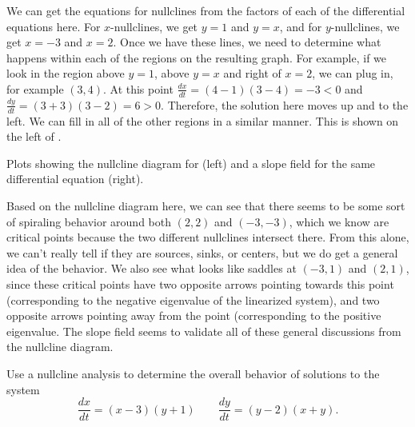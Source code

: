 \documentclass{ximera}
\begin{document}
\begin{exampleSol}
    We can get the equations for nullclines from the factors of each of the differential equations here. For $x$-nullclines, we get $y=1$ and $y=x$, and for $y$-nullclines, we get $x=-3$ and $x=2$. Once we have these lines, we need to determine what happens within each of the regions on the resulting graph. For example, if we look in the region above $y=1$, above $y=x$ and right of $x=2$, we can plug in, for example $(3,4)$. At this point $\frac{dx}{dt} = (4-1)(3-4) = -3 < 0$ and $\frac{dy}{dt} = (3+3)(3-2) = 6 > 0$. Therefore, the solution here moves up and to the left. We can fill in all of the other regions in a similar manner. This is shown on the left of .
    
    \begin{myfig}
        \capstart
        \caption{Plots showing the nullcline diagram for  (left) and a slope field for the same differential equation (right). \label{fig:NCPlot1}}
    \end{myfig}

    Based on the nullcline diagram here, we can see that there seems to be some sort of spiraling behavior around both $(2,2)$ and $(-3, -3)$, which we know are critical points because the two different nullclines intersect there. From this alone, we can't really tell if they are sources, sinks, or centers, but we do get a general idea of the behavior. We also see what looks like saddles at $(-3, 1)$ and $(2, 1)$, since these critical points have two opposite arrows pointing towards this point (corresponding to the negative eigenvalue of the linearized system), and two opposite arrows pointing away from the point (corresponding to the positive eigenvalue. The slope field seems to validate all of these general discussions from the nullcline diagram.
\end{exampleSol}



\begin{example} \label{ex:Nullcline2}
    Use a nullcline analysis to determine the overall behavior of solutions to the system
    \begin{equation*}
        \frac{dx}{dt} = (x-3)(y+1) \qquad \frac{dy}{dt} = (y-2)(x+y).
    \end{equation*}
\end{example}
\end{document}
